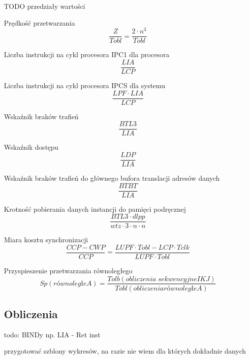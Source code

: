 \documentclass[12pt,a4paper]{article}
\begin{document}
{\huge TODO przedziały wartości}

Prędkość przetwarzania
\begin{equation}
\frac{Z}{Tobl} = \frac{2 \cdot n^3}{Tobl}
\end{equation}

Liczba instrukcji na cykl procesora IPC1 dla procesora
\begin{equation}
\frac{LIA}{LCP}
\end{equation}

Liczba instrukcji na cykl procesora IPCS dla systemu
\begin{equation}
\frac{LPF \cdot LIA}{LCP}
\end{equation}

Wskaźnik braków trafień
\begin{equation}
\frac{BTL3}{LIA}
\end{equation}

Wskaźnik dostępu
\begin{equation}
\frac{LDP}{LIA}
\end{equation}

Wskaźnik braków trafień do głównego bufora translacji adresów danych
\begin{equation}
\frac{BTBT}{LIA}
\end{equation}

Krotność pobierania danych instancji do pamięci podręcznej
\begin{equation}
\frac{BTL3 \cdot dlpp}{wtz \cdot 3 \cdot n \cdot n}
\end{equation}

Miara kosztu synchronizacji
\begin{equation}
\frac{CCP - CWP}{CCP} = \frac{LUPF \cdot Tobl - LCP \cdot Tclk}{LUPF \cdot Tobl}
\end{equation}

Przyspieszenie przetwarzania równoległego
\begin{equation}
Sp(równoległe A) = \frac{Tolb(obliczenia \; sekwencyjne IKJ)}{Tobl(obliczenia równoległe A)}
\end{equation}


\subsection{Obliczenia}
todo: BINDy np. LIA - Ret inst

przygotować szblony wykresów, na razie nie  wiem dla których dokładnie danych 


\end{document}
